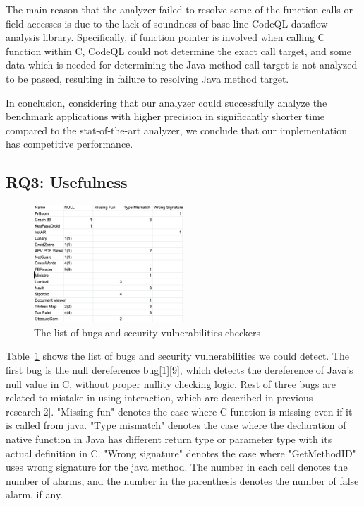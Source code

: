 The main reason that the analyzer failed to resolve some of the function calls
or field accesses is due to the lack of soundness of base-line CodeQL dataflow
analysis library.  Specifically, if function pointer is involved when calling C
function within C, CodeQL could not determine the exact call target, and some
data which is needed for determining the Java method call target is not
analyzed to be passed, resulting in failure to resolving Java method target.

In conclusion, considering that our analyzer could successfully analyze the
benchmark applications with higher precision in significantly shorter time
compared to the stat-of-the-art analyzer, we conclude that our implementation
has competitive performance.

\subsection{RQ3: Usefulness}
\begin{figure}[t]
  \centering
  \vspace{2mm}
  \includegraphics[width=0.5\textwidth]{img/table3}
  \vspace*{-1.5em}
  \caption{The list of bugs and security vulnerabilities checkers}
  \label{fig:table3}
\vspace*{-.5em}
\end{figure}

Table~\ref{fig:table3} shows the list of bugs and security vulnerabilities we could detect.
The first bug is the null dereference bug[1][9], which detects the dereference of
Java's null value in C, without proper nullity checking logic. Rest of three
bugs are related to mistake in using interaction, which are described in
previous research[2]. "Missing fun" denotes the case where C function is
missing even if it is called from java. "Type mismatch" denotes the case where
the declaration of native function in Java has different return type or
parameter type with its actual definition in C.  "Wrong signature" denotes the
case where "GetMethodID" uses wrong signature for the java method. The
number in each cell denotes the number of alarms, and the number in the
parenthesis denotes the number of false alarm, if any.

